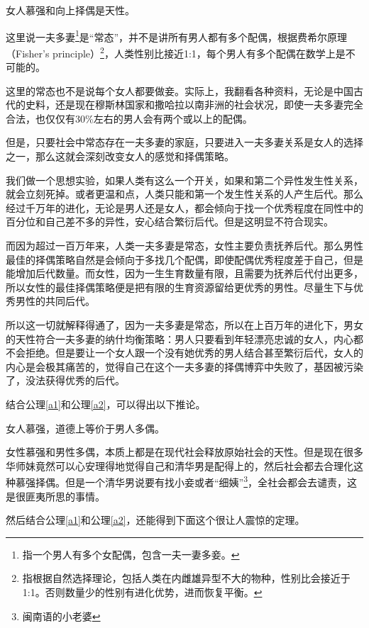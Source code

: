 \begin{theorem}\label{t1}
女人慕强和向上择偶是天性。
\end{theorem}

这里说一夫多妻\footnote{指一个男人有多个女配偶，包含一夫一妻多妾。}是``常态''，并不是讲所有男人都有多个配偶，根据费希尔原理（Fisher's principle）\footnote{指根据自然选择理论，包括人类在内雌雄异型不大的物种，性别比会接近于1:1。否则数量少的性别有进化优势，进而恢复平衡。}，人类性别比接近1:1，每个男人有多个配偶在数学上是不可能的。

这里的常态也不是说每个女人都要做妾。实际上，我翻看各种资料，无论是中国古代的史料，还是现在穆斯林国家和撒哈拉以南非洲的社会状况，即使一夫多妻完全合法，也仅仅有30\%左右的男人会有两个或以上的配偶。

但是，只要社会中常态存在一夫多妻的家庭，只要进入一夫多妻关系是女人的选择之一，那么这就会深刻改变女人的感觉和择偶策略。

我们做一个思想实验，如果人类有这么一个开关，如果和第二个异性发生性关系，就会立刻死掉。或者更温和点，人类只能和第一个发生性关系的人产生后代。那么经过千万年的进化，无论是男人还是女人，都会倾向于找一个优秀程度在同性中的百分位和自己差不多的异性，安心结合繁衍后代。但是这明显不符合现实。

而因为超过一百万年来，人类一夫多妻是常态，女性主要负责抚养后代。那么男性最佳的择偶策略自然是会倾向于多找几个配偶，即使配偶优秀程度差于自己，但是能增加后代数量。而女性，因为一生生育数量有限，且需要为抚养后代付出更多，所以女性的最佳择偶策略便是把有限的生育资源留给更优秀的男性。尽量生下与优秀男性的共同后代。

所以这一切就解释得通了，因为一夫多妻是常态，所以在上百万年的进化下，男女的天性符合一夫多妻的纳什均衡策略：男人只要看到年轻漂亮忠诚的女人，内心都不会拒绝。但是要让一个女人跟一个没有她优秀的男人结合甚至繁衍后代，女人的内心是会极其痛苦的，觉得自己在这个一夫多妻的择偶博弈中失败了，基因被污染了，没法获得优秀的后代。

结合公理\ref{a1}和公理\ref{a2}，可以得出以下推论。

\begin{corollary}\label{c1}
女人慕强，道德上等价于男人多偶。
\end{corollary}

女性慕强和男性多偶，本质上都是在现代社会释放原始社会的天性。但是现在很多华师妹竟然可以心安理得地觉得自己和清华男是配得上的，然后社会都去合理化这种慕强择偶。但是一个清华男说要有找小妾或者``细姨''\footnote{闽南语的小老婆}，全社会都会去谴责，这是很匪夷所思的事情。

然后结合公理\ref{a1}和公理\ref{a2}，还能得到下面这个很让人震惊的定理。

